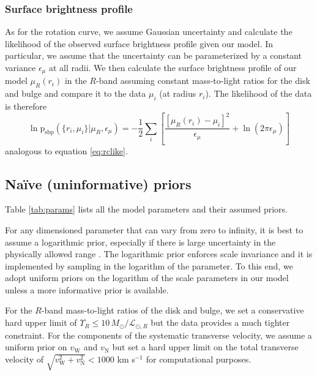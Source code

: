 \documentclass[preprint]{aastex}
\newcommand{\Tab}[1]{Table \ref{tab:#1}}
\newcommand{\eqlabel}[1]{\label{eq:#1}}
\newcommand{\eq}[1]{equation \ref{eq:#1}}
\begin{document}
\subsubsection{Surface brightness profile}

As for the rotation curve, we assume Gaussian uncertainty and calculate the
likelihood of the observed surface brightness profile given our model.  In
particular, we assume that the uncertainty can be parameterized by a constant
variance $\epsilon_\mu$ at all radii.  We then calculate the surface brightness
profile of our model $\mu_R (r_i)$ in the $R$-band assuming constant
mass-to-light ratios for the disk and bulge and compare it to the data
$\mu_i$ (at radius $r_i$).  The likelihood of the data is therefore
\begin{equation}
    \eqlabel{sbpprob}
    \ln \mathrm{p}_\mathrm{sbp} (\{ r_i, \mu_i \} | \mu_R,\epsilon_\mu )
    = - \frac{1}{2} \sum_i \left [ \frac{\left [ \mu_R (r_i) - \mu_i \right ]^2 }
        {\epsilon_\mu} + \ln (2 \pi \epsilon_\mu) \right ]
\end{equation}
analogous to \eq{rclike}.



\subsection{Na\"ive (uninformative) priors}

\label{sect:priors}

\Tab{params} lists all the model parameters and their assumed priors.

For any dimensioned parameter that can vary from zero to infinity, it is best to
assume a logarithmic prior, especially if there is large uncertainty in the
physically allowed range \citep{Gregory:2005}.  The logarithmic prior enforces
scale invariance and it is implemented by sampling in the logarithm of the parameter.
To this end, we adopt uniform priors on the logarithm of the scale parameters in
our model unless a more informative prior is available.

For the $R$-band mass-to-light ratios of the disk and bulge, we set a conservative
hard upper limit of $\Upsilon_R \le 10 \, M_\odot /\mathcal{L}_{\odot,R}$ but
the data provides a much tighter constraint.  For the components of the systematic
transverse velocity, we assume a uniform prior on $v_\mathrm{W}$ and $v_\mathrm{N}$
but set a hard upper limit on the total transverse velocity of
$\sqrt{v_\mathrm{W}^2+v_\mathrm{N}^2} < 1000$ km s$^{-1}$ for computational purposes.
\end{document}
